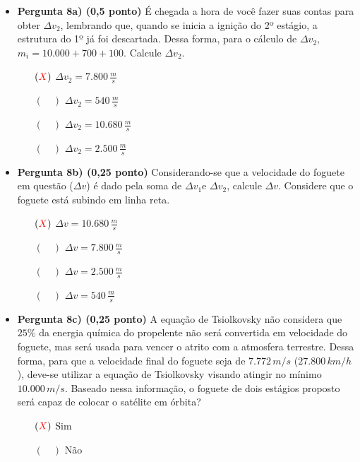 \documentclass[a4paper, 12pt]{article}
\newcommand{\red}[1]{\textcolor{red}{#1}}
\begin{document}
\begin{flushleft}
\begin{itemize}
\begin{itemize}
                    \item \textbf{Pergunta 8a) (0,5 ponto)} É chegada a hora de você fazer suas contas para obter $\Delta v_2$, lembrando que, quando se inicia a ignição do 2º estágio, a estrutura do 1º já foi descartada. Dessa forma, para o cálculo de $\Delta v_2$, $m_i = 10.000 + 700 + 100$. Calcule $\Delta v_2$.
                        \begin{itemize}
                            \item[$(\red{X})$] $\Delta v_2 = 7.800 \, \frac{m}{s}$
                            \item[$(\quad)$] $\Delta v_2 = 540 \, \frac{m}{s}$
                            \item[$(\quad)$] $\Delta v_2 = 10.680 \, \frac{m}{s}$
                            \item[$(\quad)$] $\Delta v_2 = 2.500 \, \frac{m}{s}$
                        \end{itemize}
                    \item \textbf{Pergunta 8b) (0,25 ponto)} Considerando-se que a velocidade do foguete em questão ($\Delta v$) é dado pela soma de $\Delta v_1$e $\Delta v_2$, calcule $\Delta v$. Considere que o foguete está subindo em linha reta.
                        \begin{itemize}
                            \item[$(\red{X})$] $\Delta v = 10.680 \, \frac{m}{s}$
                            \item[$(\quad)$] $\Delta v = 7.800 \, \frac{m}{s}$
                            \item[$(\quad)$] $\Delta v = 2.500 \, \frac{m}{s}$
                            \item[$(\quad)$] $\Delta v = 540 \, \frac{m}{s}$
                        \end{itemize}
                    \item \textbf{Pergunta 8c) (0,25 ponto)} A equação de Tsiolkovsky não considera que $25\%$ da energia química do propelente não será convertida em velocidade do foguete, mas será usada para vencer o atrito com a atmosfera terrestre. Dessa forma, para que a velocidade final do foguete seja de $7.772 \, m/s$ ($27.800 \, km/h$), deve-se utilizar a equação de Tsiolkovsky visando atingir no mínimo $10.000 \, m/s$. Baseado nessa informação, o foguete de dois estágios proposto será capaz de colocar o satélite em órbita?
                        \begin{itemize}
                            \item[$(\red{X})$] Sim
                            \item[$(\quad)$] Não
                        \end{itemize}
                \end{itemize}
            

\end{itemize}
\end{flushleft}
\end{document}
